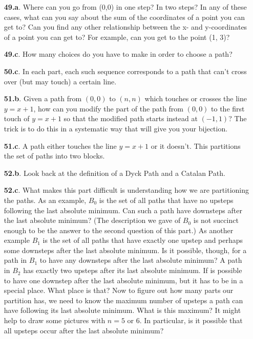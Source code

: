 \documentclass[10pt,]{book}
\theoremstyle{plain}
\theoremstyle{definition}
\theoremstyle{definition}
\numberwithin{equation}{chapter}
\begin{document}
\begin{itemize}[itemsep=1em]
\item[\textbf{49.a}.]Where can you go from (0,0) in one step? In two steps? In any of these cases, what can you say about the sum of the coordinates of a point you can get to? Can you find any other relationship between the x- and y-coordinates of a point you can get to? For example, can you get to the point (1, 3)?%

\item[\textbf{49.c}.]How many choices do you have to make in order to choose a path?%

\item[\textbf{50.c}.]In each part, each such sequence corresponds to a path that can't cross over (but may touch) a certain line.%

\item[\textbf{51.b}.]Given a path from \((0, 0)\) to \((n, n)\) which touches or crosses the line \(y = x + 1\), how can you modify the part of the path from \((0, 0)\) to the first touch of \(y = x + 1\) so that the modified path starts instead at \((-1, 1)\)? The trick is to do this in a systematic way that will give you your bijection.%

\item[\textbf{51.c}.]A path either touches the line \(y = x + 1\) or it doesn't. This partitions the set of paths into two blocks.%

\item[\textbf{52.b}.]Look back at the definition of a Dyck Path and a Catalan Path.%

\item[\textbf{52.c}.]What makes this part difficult is understanding how we are partitioning the paths. As an example, \(B_0\) is the set of all paths that have no upsteps following the last absolute minimum. Can such a path have downsteps after the last absolute minimum? (The description we gave of \(B_0\) is not succinct enough to be the answer to the second question of this part.) As another example \(B_1\) is the set of all paths that have exactly one upstep and perhaps some downsteps after the last absolute minimum. Is it possible, though, for a path in \(B_1\) to have any downsteps after the last absolute minimum? A path in \(B_2\) has exactly two upsteps after its last absolute minimum. If is possible to have one downstep after the last absolute minimum, but it has to be in a special place. What place is that? Now to figure out how many parts our partition has, we need to know the maximum number of upsteps a path can have following its last absolute minimum. What is this maximum? It might help to draw some pictures with \(n = 5\) or \(6\). In particular, is it possible that all upsteps occur after the last absolute minimum?%


\end{itemize}
\end{document}
